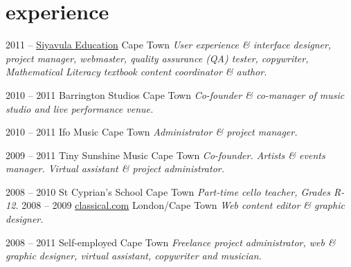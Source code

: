 \documentclass[]{friggeri-cv} %
\begin{document}

\section{experience}

\begin{entrylist}
\entry
{2011 --}
{\href{http://www.siyavula.com}{\underline{Siyavula Education}}}
{Cape Town}
{\emph{User experience \& interface designer, project manager, webmaster, quality assurance (QA) tester, copywriter, Mathematical Literacy textbook content coordinator \& author.}}

\entry
{2010 -- 2011}
{Barrington Studios}
{Cape Town}
{\emph{Co-founder \& co-manager of music studio and live performance venue.}}



\entry
{2010 -- 2011}
{Ifo Music}
{Cape Town}
{\emph{Administrator \& project manager.}}

\entry
{2009 -- 2011}
{Tiny Sunshine Music}
{Cape Town}
{\emph{Co-founder. Artists \& events manager. Virtual assistant \& project administrator.}}


\entry
{2008 -- 2010}
{St Cyprian's School}
{Cape Town}
{\emph{Part-time cello teacher, Grades R-12.}}
\entry
{2008 -- 2009}
{\href{http://www.classical.com}{\underline{classical.com}}}
{London/Cape Town}
{\emph{Web content editor \& graphic designer.}}


\entry
{2008 -- 2011}
{Self-employed}
{Cape Town}
{\emph{Freelance project administrator, web \& graphic designer, virtual assistant, copywriter and musician.}}

\end{entrylist}

\end{document}
